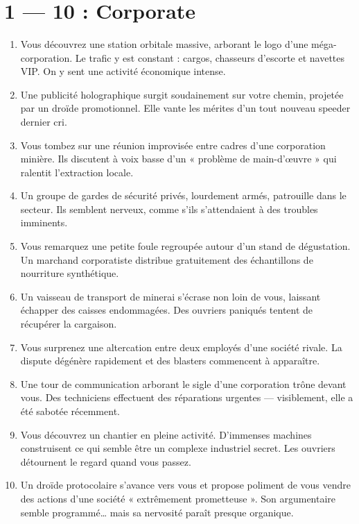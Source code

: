 \documentclass{article}
\begin{document}
\title{\vspace{-0.5cm}{\Huge 101 Secrets Star Wars} \vspace{-1cm}}

\date{}

\maketitle

\section*{1 --- 10 : Corporate}
\begin{enumerate}
	\item Vous découvrez une station orbitale massive, arborant le logo d’une méga-corporation. Le trafic y est constant : cargos, chasseurs d’escorte et navettes VIP. On y sent une activité économique intense.
	\item Une publicité holographique surgit soudainement sur votre chemin, projetée par un droïde promotionnel. Elle vante les mérites d’un tout nouveau speeder dernier cri.
	\item Vous tombez sur une réunion improvisée entre cadres d’une corporation minière. Ils discutent à voix basse d’un « problème de main-d’œuvre » qui ralentit l’extraction locale.
	\item Un groupe de gardes de sécurité privés, lourdement armés, patrouille dans le secteur. Ils semblent nerveux, comme s’ils s’attendaient à des troubles imminents.
	\item Vous remarquez une petite foule regroupée autour d’un stand de dégustation. Un marchand corporatiste distribue gratuitement des échantillons de nourriture synthétique.
	\item Un vaisseau de transport de minerai s’écrase non loin de vous, laissant échapper des caisses endommagées. Des ouvriers paniqués tentent de récupérer la cargaison.
	\item Vous surprenez une altercation entre deux employés d’une société rivale. La dispute dégénère rapidement et des blasters commencent à apparaître.
	\item Une tour de communication arborant le sigle d’une corporation trône devant vous. Des techniciens effectuent des réparations urgentes — visiblement, elle a été sabotée récemment.
	\item Vous découvrez un chantier en pleine activité. D’immenses machines construisent ce qui semble être un complexe industriel secret. Les ouvriers détournent le regard quand vous passez.
	\item Un droïde protocolaire s’avance vers vous et propose poliment de vous vendre des actions d’une société « extrêmement prometteuse ». Son argumentaire semble programmé… mais sa nervosité paraît presque organique.
\end{enumerate}
\end{document}
